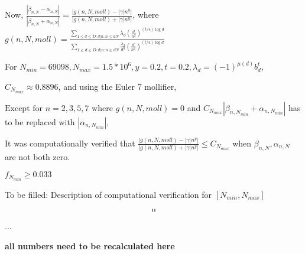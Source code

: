 Now, $\frac{|\beta_{n,N} - \alpha_{n,N}|}{|\beta_{n,N} + \alpha_{n,N}|} = \frac{|g(n,N,moll) - |\gamma|n^y|}{|g(n,N,moll) + |\gamma|n^y|}$, where
$g(n,N,moll) = \frac{\sum\limits_{1 \leq d \leq D:d|n:n \leq dN} \lambda_{d} ({\frac{d}{n^2}})^{(t/4) \log d}}{\sum\limits_{1 \leq d \leq D:d|n:n \leq dN} \frac{\lambda_{d}}{d^y} ({\frac{d}{n^2}})^{(t/4) \log d}}$



For $N_{min} = 69098, N_{max} = 1.5*10^6, y =0.2, t=0.2, \lambda_d = (-1)^{\mu(d)}b^{t}_{d},$

$C_{N_{max}} \approx 0.8896$, and using the Euler 7 mollifier,

$\textrm{Except for } n = 2,3,5,7 \textrm{ where } g(n,N,moll) = 0$ and $C_{N_{max}}|\beta_{n,N_{min}} + \alpha_{n,N_{min}}|$ has to be replaced with $|\alpha_{n,N_{min}}|$, 

It was computationally verified that $\frac{|g(n,N,moll) - |\gamma|n^y|}{|g(n,N,moll) + |\gamma|n^y|} \leq C_{N_{max}}$ when $\beta_{n,N},\alpha_{n,N}$ are not both zero.

$f_{N_{min}} \geq 0.033$

To be filled: Description of computational verification for $[N_{min},N_{max}]$


$$..$$
$$..$$
$$..$$

...

{\bf all numbers need to be recalculated here}

